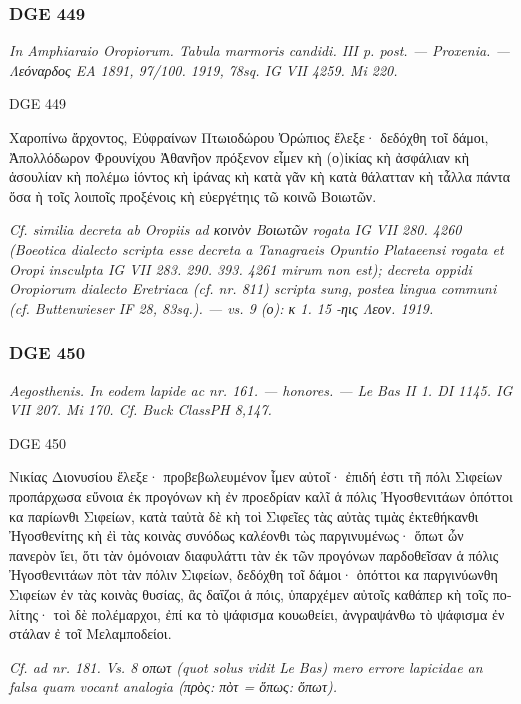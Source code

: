 \hrulefill

\subsubsection{DGE 449}
\textit{In Amphiaraio Oropiorum. Tabula marmoris candidi. III p. post. — Proxenia. — \textgreek{Λεόναρδος} EA 1891, 97/100. 1919, 78sq. IG VII 4259. Mi 220.}
\begin{versi}{DGE 449}
\begin{greek}
Χαροπίνω ἄρχοντος, Εὐφρ{\verso[1]}αίνων Πτωιοδώρου Ὀρώπι{\verso}ος ἔλεξε· δεδόχθη τοῖ δάμ{\verso}οι, Ἀπολλόδωρον Φρουνίχου Ἀθανῆον πρόξενον εἶμ{\verso}εν κὴ (ο)ἰκίας κὴ ἀσφάλιαν κὴ ἀσουλίαν κὴ πολέμω {\verso} ἰόντος κὴ ἰράνας κὴ κατὰ {\verso} γᾶν κὴ κατὰ θάλατταν κὴ τ{\verso}ἆλλα πάντα ὅσα ὴ τοῖς λο{\verso}{\K}ιποῖς προξένοις κὴ εὐεργέτηις τῶ κοινῶ Βοιωτῶν.
\end{greek}
\end{versi}
\textit{Cf. similia decreta ab Oropiis ad \textgreek{κοινὸν Βοιωτῶν} rogata IG VII 280. 4260 (Boeotica dialecto scripta esse decreta a Tanagraeis Opuntio Plataeensi rogata et Oropi insculpta IG VII 283. 290. 393. 4261 mirum non est); decreta oppidi Oropiorum dialecto Eretriaca (cf. nr. 811) scripta sung, postea lingua communi (cf. Buttenwieser IF 28, 83sq.). — vs. 9 (\textgreek{ο}): κ 1. 15 \textgreek{-ηις Λεον}. 1919.}

\hrulefill

\subsubsection{DGE 450}
\textit{Aegosthenis. In eodem lapide ac nr. 161. — honores. — Le Bas II 1. DI 1145. IG VII 207. Mi 170. Cf. Buck ClassPH 8,147.}
\begin{versi}{DGE 450}
\begin{greek}
Νικίας Διονυσίου ἔλεξε· προβεβωλευμένον {\verso[1]} ἶμεν αὐτοῖ· ἐπιδή ἐστι τῆ πόλι Σιφείων προ{\verso}πάρχωσα εὔνοια ἐκ προγόνων κὴ ἐν προεδρίαν {\verso} καλῖ ἁ πόλις Ἠγοσθενιτάων ὁπόττοι κα παρίωνθι Σιφείων, κατὰ ταὐτὰ δὲ κὴ τοὶ Σιφεῖες τὰς {\verso} αὐτὰς τιμὰς ἐκτεθήκανθι Ἠγοσθενίτης κὴ ἐ{\verso}ὶ τὰς κοινὰς συνόδως καλέονθι τὼς παργινυ{\verso}μένως· ὅπωτ ὦν πανερὸν ἴει, ὅτι τὰν ὁμόνοι{\verso}αν διαφυλάττι τὰν ἐκ τῶν προγόνων παρδοθεῖσαν ἁ πόλις Ἠγοσθενιτάων πὸτ τὰν πόλιν Σιφε{\verso}ίων, δεδόχθη τοῖ δάμοι· ὁπόττοι κα παργινύ{\verso}ωνθη Σιφείων ἐν τὰς κοινὰς θυσίας, ἃς δαΐζοι ἁ πό{\verso}ις, ὑπαρχέμεν αὐτοῖς καθάπερ κὴ τοῖς πολ{\verso}ίτης· τοὶ δὲ πολέμαρχοι, ἐπί κα τὸ ψάφισμα κουωθείει, ἀνγραψάνθω τὸ ψάφισμα ἐν στάλαν ἐ {\verso} τοῖ Μελαμποδείοι.
\end{greek}
\end{versi}
\textit{Cf. ad nr. 181. Vs. 8 \textgreek{οπωτ} (quot solus vidit Le Bas) mero errore lapicidae an falsa quam vocant analogia (\textgreek{πρὸς}: \textgreek{πὸτ} = \textgreek{ὅπως}: \textgreek{ὅπωτ}).}

